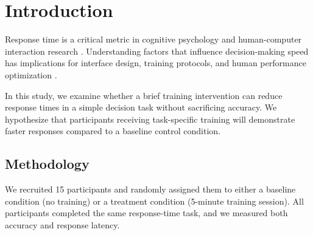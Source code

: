 \section{Introduction}

Response time is a critical metric in cognitive psychology and human-computer interaction research \cite{donders1969speed}. Understanding factors that influence decision-making speed has implications for interface design, training protocols, and human performance optimization \cite{wickens2013engineering}.

In this study, we examine whether a brief training intervention can reduce response times in a simple decision task without sacrificing accuracy. We hypothesize that participants receiving task-specific training will demonstrate faster responses compared to a baseline control condition.

\subsection{Methodology}

We recruited 15 participants and randomly assigned them to either a baseline condition (no training) or a treatment condition (5-minute training session). All participants completed the same response-time task, and we measured both accuracy and response latency.
